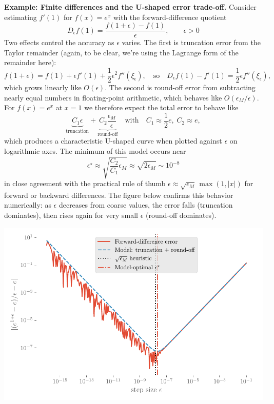 \begin{exampleBox}
    \textbf{Example: Finite differences and the U-shaped error trade-off.}
    Consider estimating \(f'(1)\) for \(f(x)=e^x\) with the forward-difference quotient
    \[
      D_\epsilon f(1) = \frac{f(1+\epsilon)-f(1)}{\epsilon},
      \qquad \epsilon>0
    \]
    Two effects control the accuracy as \(\epsilon\) varies. The first is truncation error from the Taylor remainder (again, to be clear, we're using the Lagrange form of the remainder here):
    \[
      f(1+\epsilon) = f(1) + \epsilon f'(1) + \frac{1}{2}\epsilon^2 f''(\xi_\epsilon),
      \quad \text{so} \quad
      D_\epsilon f(1) - f'(1) = \frac{1}{2}\epsilon f''(\xi_\epsilon),
    \]
    which grows linearly like \(O(\epsilon)\). The second is round-off error from subtracting nearly equal numbers in floating-point arithmetic, which behaves like \(O(\epsilon_M/\epsilon)\). For \(f(x)=e^x\) at \(x=1\) we therefore expect the total error to behave like
    \[
      \underbrace{C_1\epsilon}_{\text{truncation}} + 
      \underbrace{C_2\frac{\epsilon_M}{\epsilon}}_{\text{round-off}}
      \quad \text{with} \quad C_1 \approx \frac{1}{2}e,\; C_2 \approx e,
    \]
    which produces a characteristic U-shaped curve when plotted against \(\epsilon\) on logarithmic axes. The minimum of this model occurs near
    \[
      \epsilon^\star \approx \sqrt{\frac{C_2}{C_1}\epsilon_M}
      \approx \sqrt{2\epsilon_M}
      \sim 10^{-8}
    \]
    in close agreement with the practical rule of thumb \(\epsilon \approx \sqrt{\epsilon_M}\,\max(1,|x|)\) for forward or backward differences. The figure below confirms this behavior numerically: as \(\epsilon\) decreases from coarse values, the error falls (truncation dominates), then rises again for very small \(\epsilon\) (round-off dominates).

    \begin{center}
        \includegraphics[width=.5\textwidth]{figs/nle/forward_difference_error.pdf}
    \end{center}
    
\end{exampleBox}


